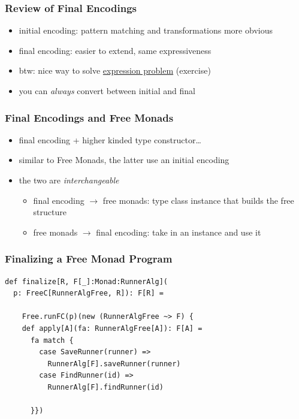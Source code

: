 \documentclass{beamer}
\begin{document}
\begin{frame}
  \frametitle{Review of Final Encodings}
  \begin{itemize}
  \item initial encoding: pattern matching and transformations more obvious
  \item final encoding: easier to extend, same expressiveness
  \item btw: nice way to solve \href{https://stackoverflow.com/questions/3596366/what-is-the-expression-problem\#3776140}{expression problem} (exercise)
  \item you can \textit{always} convert between initial and final
  \end{itemize}
\end{frame}

\begin{frame}
  \frametitle{Final Encodings and Free Monads}
  \begin{itemize}
  \item final encoding + higher kinded type constructor\ldots
  \item similar to Free Monads, the latter use an initial encoding
  \item the two are \textit{interchangeable}
    \begin{itemize}
    \item final encoding $\rightarrow$ free monads: type class instance that builds the
      free structure

    \item free monads $\rightarrow$ final encoding: take in an instance and use
      it
    \end{itemize}
  \end{itemize}
\end{frame}

\begin{frame}[fragile]
  \frametitle{Finalizing a Free Monad Program}
\begin{verbatim}
def finalize[R, F[_]:Monad:RunnerAlg](
  p: FreeC[RunnerAlgFree, R]): F[R] =

    Free.runFC(p)(new (RunnerAlgFree ~> F) {
    def apply[A](fa: RunnerAlgFree[A]): F[A] =
      fa match {
        case SaveRunner(runner) =>
          RunnerAlg[F].saveRunner(runner)
        case FindRunner(id) =>
          RunnerAlg[F].findRunner(id)

      }})
\end{verbatim}
\end{frame}
\end{document}
